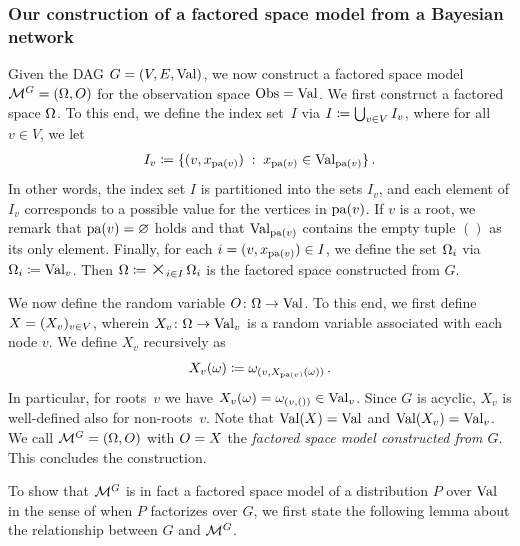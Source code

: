 \documentclass[USenglish,onecolumn]{article}
\begin{document}
\subsubsection{Our construction of a factored space model from a Bayesian network}
  
Given the DAG $G=(V,E,\textnormal{Val})$,
we now construct a factored space model $\mathcal{M}^G=(\Omega,O)$ for the observation space ${\textnormal{Obs}}=\textnormal{Val}$.
We first construct a factored space $\Omega$.
To this end, we define the index set~$I$ via $I\coloneqq\bigcup_{v\in V}  I_v$, where for all $v\in V$, we let
\begin{align}
I_v \coloneqq  \{(v,x_{\text{pa}(v)}) \;:\;  x_{\text{pa}(v)} \in
\textnormal{Val}_{\text{pa}(v)}\}\,.
\end{align}
In other words, the index set $I$ is partitioned into the sets $I_v$, and each element of $I_v$ corresponds to a possible value for the vertices in ${\text{pa}(v)}$.
If $v$ is a root, we remark that ${\text{pa}(v)}=\varnothing$ holds and that
$\textnormal{Val}_{\text{pa}(v)}$
contains the empty tuple $()$ as its only element.
Finally, for each $i=(v, x_{\text{pa}(v)})\in I$, we define the set $\Omega_i$ via $\Omega_i\coloneqq\textnormal{Val}_v$. Then $\FSG\coloneqq\timesbig_\iinI \FSG_i$ is the factored space constructed from $G$.

We now define the random variable $O\colon \Omega\to\textnormal{Val}$.
To this end, we first define $X=(X_v)_{v\in V} $, wherein $X_v\colon \Omega\to\textnormal{Val}_v$ is a random variable associated with each node $v$.
%
We define $X_v$ recursively as
\begin{align}\label{eq:def-graph-X}
    X_v(\omega)\coloneqq \omega_{(v, X_{\text{pa}(v)}(\omega))}\,.
\end{align}
%
In particular, for roots~$v$ we have $X_v(\omega)=\omega_{(v,())}\in\textnormal{Val}_v$.
Since $G$ is acyclic, $X_v$ is well-defined also for non-roots~$v$. Note that $\textnormal{Val}(X)=\textnormal{Val}$ and $\textnormal{Val}(X_v)=\textnormal{Val}_v$.
We call $\mathcal{M}^G=(\Omega, O)$ with $O=X$ the \emph{factored space model constructed from $G$}. This concludes the construction.

To show that $\mathcal{M}^G$ is in fact a factored space model of a distribution $P$ over $\textnormal{Val}$ in the sense of  when $P$ factorizes over $G$, we first state the following lemma about the relationship between $G$ and $\mathcal{M}^G$.
\end{document}
